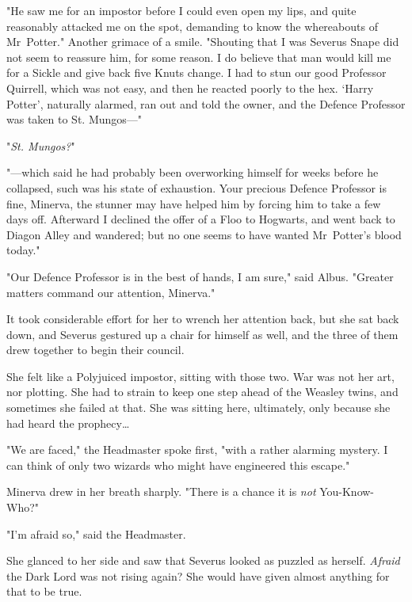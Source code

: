 "He saw me for an impostor before I could even open my lips, and quite
reasonably attacked me on the spot, demanding to know the whereabouts of
Mr~Potter." Another grimace of a smile. "Shouting that I was Severus Snape did
not seem to reassure him, for some reason. I do believe that man would kill me
for a Sickle and give back five Knuts change. I had to stun our good Professor
Quirrell, which was not easy, and then he reacted poorly to the hex. `Harry
Potter', naturally alarmed, ran out and told the owner, and the Defence
Professor was taken to St. Mungos---"

"\emph{St. Mungos?}"

"---which said he had probably been overworking himself for weeks before he
collapsed, such was his state of exhaustion. Your precious Defence Professor is
fine, Minerva, the stunner may have helped him by forcing him to take a few
days off. Afterward I declined the offer of a Floo to Hogwarts, and went back
to Diagon Alley and wandered; but no one seems to have wanted Mr~Potter's
blood today."

"Our Defence Professor is in the best of hands, I am sure," said Albus.
"Greater matters command our attention, Minerva."

It took considerable effort for her to wrench her attention back, but she sat
back down, and Severus gestured up a chair for himself as well, and the three
of them drew together to begin their council.

She felt like a Polyjuiced impostor, sitting with those two. War was not her
art, nor plotting. She had to strain to keep one step ahead of the Weasley
twins, and sometimes she failed at that. She was sitting here, ultimately, only
because she had heard the prophecy…

"We are faced," the Headmaster spoke first, "with a rather alarming mystery. I
can think of only two wizards who might have engineered this escape."

Minerva drew in her breath sharply. "There is a chance it is \emph{not}
You-Know-Who?"

"I'm afraid so," said the Headmaster.

She glanced to her side and saw that Severus looked as puzzled as herself.
\emph{Afraid} the Dark Lord was not rising again? She would have given almost
anything for that to be true.

